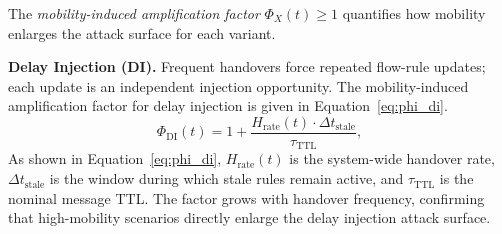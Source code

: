 The \emph{mobility-induced amplification factor} $\Phi_X(t)\geq 1$
quantifies how mobility enlarges the attack surface for each variant.

\textbf{Delay Injection (DI).} Frequent handovers force repeated
flow-rule updates; each update is an independent injection
opportunity. The mobility-induced amplification factor for delay
injection is given in Equation~\eqref{eq:phi_di}.
\begin{equation}
\Phi_{\mathrm{DI}}(t) = 1 +
  \frac{H_{\mathrm{rate}}(t)\cdot\Delta t_{\mathrm{stale}}}
       {\tau_{\mathrm{TTL}}},
\label{eq:phi_di}
\end{equation}
As shown in Equation~\eqref{eq:phi_di}, $H_{\mathrm{rate}}(t)$
is the system-wide handover rate, $\Delta t_{\mathrm{stale}}$
is the window during which stale rules remain active, and
$\tau_{\mathrm{TTL}}$ is the nominal message TTL. The factor
grows with handover frequency, confirming that high-mobility
scenarios directly enlarge the delay injection attack surface.

